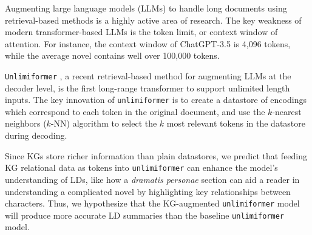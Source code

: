 Augmenting large language models (LLMs) to handle long documents using retrieval-based methods is a highly active area of research. The key weakness of modern transformer-based LLMs is the token limit, or context window of attention. For instance, the context window of ChatGPT-3.5 is 4,096 tokens, while the average novel contains well over 100,000 tokens.

\texttt{Unlimiformer} \cite{bertsch2023unlimiformer}, a recent retrieval-based method for augmenting LLMs at the decoder level, is the first long-range transformer to support unlimited length inputs. The key innovation of \texttt{unlimiformer} is to create a datastore of encodings which correspond to each token in the original document, and use the $k$-nearest neighbors ($k$-NN) algorithm to select the $k$ most relevant tokens in the datastore during decoding.

Since KGs store richer information than plain datastores, we predict that feeding KG relational data as tokens into \texttt{unlimiformer} can enhance the model's understanding of LDs, like how a \textit{dramatis personae} section can aid a reader in understanding a complicated novel by highlighting key relationships between characters. Thus, we hypothesize that the KG-augmented \texttt{unlimiformer} model will produce more accurate LD summaries than the baseline \texttt{unlimiformer} model.